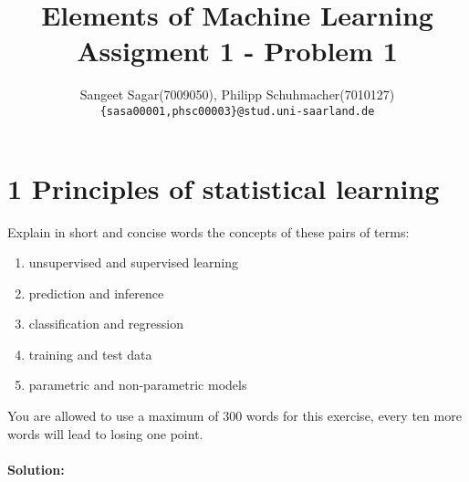 \documentclass{article}[a4paper]
\title{\textbf{Elements of Machine Learning}\\
Assigment 1 - Problem 1
}
\author{ Sangeet Sagar(7009050), Philipp Schuhmacher(7010127)\\
        \texttt{\{sasa00001,phsc00003\}@stud.uni-saarland.de}
}
\begin{document}
\maketitle
\section*{1 Principles of statistical learning}
Explain in short and concise words the concepts of these pairs of terms:
\begin{enumerate}
    \item unsupervised and supervised learning
    \item prediction and inference
    \item classification and regression
    \item training and test data
    \item parametric and non-parametric models
\end{enumerate}
You are allowed to use a maximum of 300 words for this exercise, every ten more words will lead to losing one point.
\\~\\
\textbf{Solution:}\\
\end{document}
